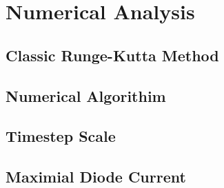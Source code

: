 \section{Numerical Analysis}
\subsection{Classic Runge-Kutta Method}
\subsection{Numerical Algorithim}
\subsection{Timestep Scale}
\subsection{Maximial Diode Current}